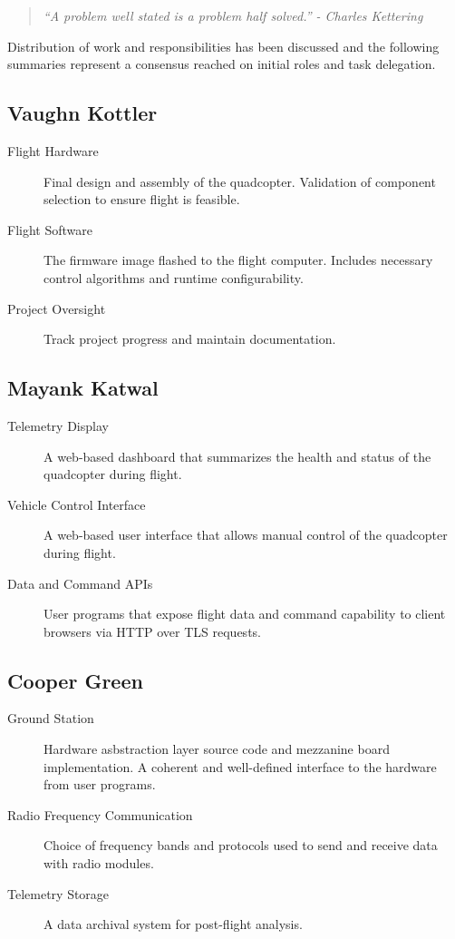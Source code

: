\documentclass{article}
\begin{document}
\begin{quote}
	\textit{``A problem well stated is a problem half
	solved.'' - Charles Kettering}
\end{quote}

\noindent Distribution of work and responsibilities has been discussed and the
following summaries represent a consensus reached on initial roles and task
delegation.

\subsection{Vaughn Kottler}

\begin{description}
	\item [Flight Hardware] Final design and assembly of the quadcopter.
		Validation of component selection to ensure flight is feasible.
	\item [Flight Software] The firmware image flashed to the flight
		computer. Includes necessary control algorithms and runtime
		configurability.
	\item [Project Oversight] Track project progress and maintain
		documentation.
\end{description}

\subsection{Mayank Katwal}

\begin{description}
	\item [Telemetry Display] A web-based dashboard that summarizes the health
		and status of the quadcopter during flight.
	\item [Vehicle Control Interface] A web-based user interface that allows
		manual control of the quadcopter during flight.
	\item [Data and Command APIs] User programs that expose flight data
		and command capability to client browsers via HTTP over TLS requests.
\end{description}

\subsection{Cooper Green}

\begin{description}
	\item [Ground Station] Hardware asbstraction layer source code and
		mezzanine board implementation. A coherent and well-defined interface
		to the hardware from user programs.
	\item [Radio Frequency Communication] Choice of frequency bands and
		protocols used to send and receive data with radio modules.
	\item [Telemetry Storage] A data archival system for post-flight analysis.
\end{description}
\end{document}
